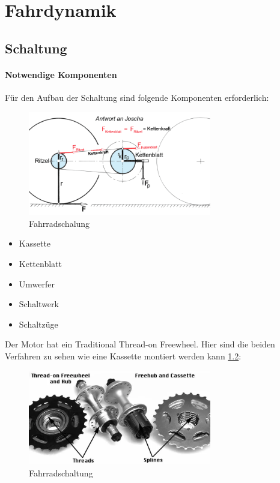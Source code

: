 \chapter{Fahrdynamik}


\section{Schaltung}

\subsubsection*{Notwendige Komponenten}
Für den Aufbau der Schaltung sind folgende Komponenten erforderlich:

\begin{figure}[h]
    \centering
    \includegraphics[width=8cm]{images/fahrrad_kraefte_gross.png}
    \caption{Fahrradschalung\cite{noauthor_schaltung_nodate}}%
    \label{fig:16}
\end{figure}
  

\begin{itemize}
    \item Kassette 
    \item Kettenblatt 
    \item Umwerfer
    \item Schaltwerk
    \item Schaltzüge
\end{itemize}

Der Motor hat ein Traditional Thread-on Freewheel. Hier sind die beiden Verfahren zu sehen wie eine Kassette montiert werden kann \ref{fig:17}:

\begin{figure}[h!]
    \centering
    \includegraphics[width=8cm]{images/freewheel-vs-k7.png}
    \caption{Fahrradschaltung\cite{noauthor_traditional_nodate}}
    \label{fig:17}
\end{figure}


